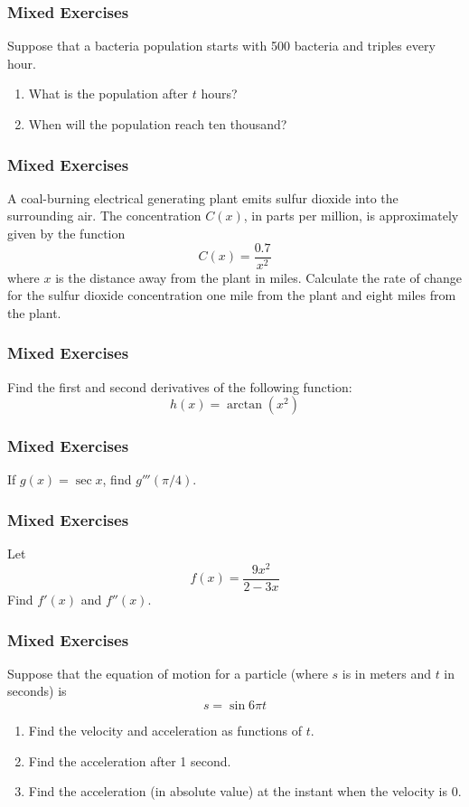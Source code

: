 \documentclass[xcolor=dvipsnames]{beamer}
\begin{document}
\begin{frame}
  \frametitle{Mixed Exercises}
  {\ubung} Suppose that a bacteria population starts with 500 bacteria and
  triples every hour.
  \begin{enumerate}
  \item What is the population after $t$ hours?
  \item When will the population reach ten thousand?
  \end{enumerate}
\end{frame}

\begin{frame}
  \frametitle{Mixed Exercises}
  {\ubung} A coal-burning electrical generating plant emits sulfur dioxide into
  the surrounding air. The concentration $C(x)$, in parts per million,
  is approximately given by the function
  \begin{equation}
    \label{eq:sahtuodo}
    C(x)=\frac{0.7}{x^{2}}
  \end{equation}
  where $x$ is the distance away from the plant in miles. Calculate
  the rate of change for the sulfur dioxide concentration one mile
  from the plant and eight miles from the plant.
\end{frame}

\begin{frame}
  \frametitle{Mixed Exercises}
  {\ubung} Find the first and second derivatives of the following function:
  \begin{equation}
    \label{eq:oophacuz}
    h(x)=\arctan(x^{2})
  \end{equation}
\end{frame}

\begin{frame}
  \frametitle{Mixed Exercises}
  {\ubung} If $g(x)=\sec{}x$, find $g'''(\pi/4)$.
\end{frame}

\begin{frame}
  \frametitle{Mixed Exercises}
  {\ubung} Let
  \begin{equation}
    \label{eq:roohahou}
    f(x)=\frac{9x^{2}}{2-3x}
  \end{equation}
Find $f'(x)$ and $f''(x)$.
\end{frame}

\begin{frame}
  \frametitle{Mixed Exercises}
  {\ubung} Suppose that the equation of motion for a particle (where $s$ is in
  meters and $t$ in seconds) is
  \begin{equation}
    \label{eq:eelajaim}
    s=\sin{}6\pi{}t
  \end{equation}
  \begin{enumerate}
  \item Find the velocity and acceleration as functions of $t$. 
  \item Find the acceleration after 1 second.
  \item Find the acceleration (in absolute value) at the instant when the velocity is 0.
  \end{enumerate}
\end{frame}
\end{document}
